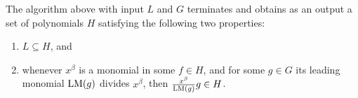 %
%
%

\begin{theorem}
    \label{thm:SymbolicPreprocessingResult}
    The algorithm above with input \(L\) and \(G\) terminates and obtains as an
    output a set of polynomials \(H\) satisfying the following two properties:
    \begin{enumerate}[label=\textbf{(\roman*)}]
        \item \(L \subseteq H\), and
        \item whenever \(x^\beta\) is a monomial in some \(f \in H\), and for
        some \(g \in G\) its leading monomial \(\mathrm{LM}(g)\) divides
        \(x^\beta\), then \(\frac{x^\beta}{\mathrm{LM}(g)} g \in H\).
    \end{enumerate}
\end{theorem}


